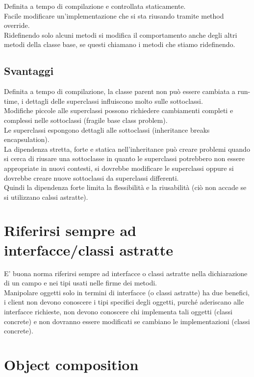 \documentclass{article}
\begin{document}
Definita a tempo di compilazione e controllata staticamente.\\
Facile modificare un’implementazione che si sta riusando tramite method override.\\
Ridefinendo solo alcuni metodi si modifica il comportamento anche degli altri metodi della classe base, se questi chiamano i metodi che stiamo ridefinendo.

\subsection*{Svantaggi}

Definita a tempo di compilazione, la classe parent non può essere cambiata a run-time, i dettagli delle superclassi influiscono molto sulle sottoclassi.\\
Modifiche piccole alle superclassi possono richiedere cambiamenti completi e complessi nelle sottoclassi (fragile base class problem).\\
Le superclassi espongono dettagli alle sottoclassi (inheritance breaks encapsulation).\\
La dipendenza stretta, forte e statica nell’inheritance può creare problemi quando si cerca di riusare una sottoclasse in quanto le superclassi potrebbero non essere appropriate in nuovi contesti, si dovrebbe modificare le superclassi oppure si dovrebbe creare nuove sottoclassi da superclassi differenti.\\
Quindi la dipendenza forte limita la flessibilità e la riusabilità (ciò non accade se si utilizzano calssi astratte).\\

\section*{Riferirsi sempre ad interfacce/classi astratte}

E' buona norma riferirsi sempre ad interfacce o classi astratte nella dichiarazione di un campo e nei tipi usati nelle firme dei metodi.\\
Manipolare oggetti solo in termini di interfacce (o classi astratte) ha due benefici, i client non devono conoscere i tipi specifici degli oggetti, purché aderiscano alle interfacce richieste, non devono conoscere chi implementa tali oggetti (classi concrete) e non dovranno essere modificati se cambiano le implementazioni (classi concrete).\\

\section*{Object composition}
\end{document}
